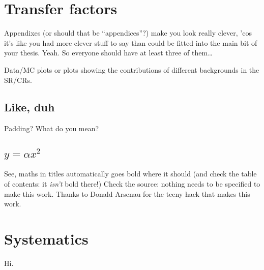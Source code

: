 \chapter{Transfer factors}
\label{app:TFs}


Appendixes (or should that be ``appendices''?) make you look really clever, 'cos
it's like you had more clever stuff to say than could be fitted into the main
bit of your thesis. Yeah. So everyone should have at least three of them\dots

Data/MC plots or plots showing the contributions of different backgrounds in 
the SR/CRs.

\section{Like, duh}
\label{sec:Duh}
Padding? What do you mean?

\section{$y = \alpha x^2$}
\label{sec:EqnTitle}
See, maths in titles automatically goes bold where it should (and check the
table of contents: it \emph{isn't} bold there!) Check the source: nothing
needs to be specified to make this work. Thanks to Donald Arsenau for the
teeny hack that makes this work.

%

\chapter{Systematics}
\label{app:systs}

Hi.